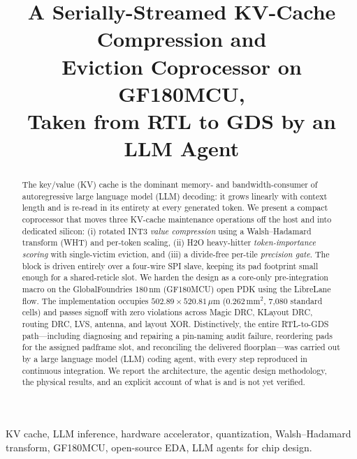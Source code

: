 \documentclass[conference]{IEEEtran}
\begin{document}
\title{A Serially-Streamed KV-Cache Compression and\\
Eviction Coprocessor on GF180MCU,\\
Taken from RTL to GDS by an LLM Agent}

\author{
}

\maketitle

\begin{abstract}
The key/value (KV) cache is the dominant memory- and bandwidth-consumer of
autoregressive large language model (LLM) decoding: it grows linearly with
context length and is re-read in its entirety at every generated token. We
present a compact coprocessor that moves three KV-cache maintenance operations
off the host and into dedicated silicon: (i) rotated INT3 \emph{value
compression} using a Walsh--Hadamard transform (WHT) and per-token scaling,
(ii) H2O heavy-hitter \emph{token-importance scoring} with single-victim
eviction, and (iii) a divide-free per-tile \emph{precision gate}. The block is
driven entirely over a four-wire SPI slave, keeping its pad footprint small
enough for a shared-reticle slot. We harden the design as a core-only
pre-integration macro on the GlobalFoundries 180\,nm (GF180MCU) open PDK using
the LibreLane flow. The implementation occupies $502.89\times520.81\,\mu\text{m}$
($0.262\,\text{mm}^2$, 7{,}080 standard cells) and passes signoff with zero
violations across Magic DRC, KLayout DRC, routing DRC, LVS, antenna, and layout
XOR. Distinctively, the entire RTL-to-GDS path---including diagnosing and
repairing a pin-naming audit failure, reordering pads for the assigned padframe
slot, and reconciling the delivered floorplan---was carried out by a large
language model (LLM) coding agent, with every step reproduced in continuous
integration. We report the architecture, the agentic design methodology, the
physical results, and an explicit account of what is and is not yet verified.
\end{abstract}

\begin{IEEEkeywords}
KV cache, LLM inference, hardware accelerator, quantization, Walsh--Hadamard
transform, GF180MCU, open-source EDA, LLM agents for chip design.
\end{IEEEkeywords}
\end{document}
